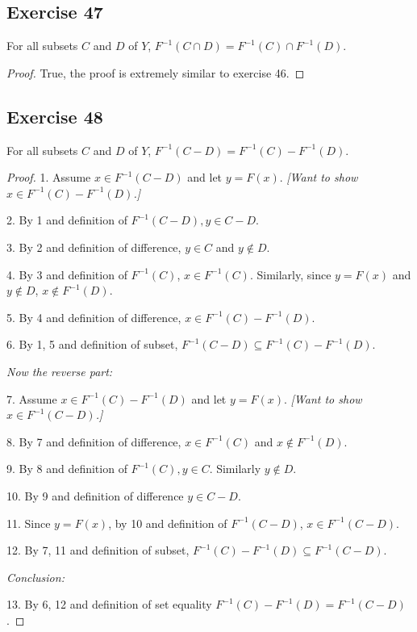 \documentclass[14pt]{extarticle}
\begin{document}
\subsection{Exercise 47}
For all subsets $C$ and $D$ of $Y$, \(F^{-1}(C \cap D) = F^{-1}(C) \cap F^{-1}(D)\).

\begin{proof}
True, the proof is extremely similar to exercise 46.
\end{proof}

\subsection{Exercise 48}
For all subsets $C$ and $D$ of $Y$, \(F^{-1}(C-D) = F^{-1}(C) - F^{-1}(D)\).

\begin{proof}
1. Assume \(x \in F^{-1}(C-D)\) and let $y = F(x)$. {\it [Want to show \(x \in F^{-1}(C) - F^{-1}(D)\).]}

2. By 1 and definition of \(F^{-1}(C-D), y \in C-D\).

3. By 2 and definition of difference, \(y \in C\) and \(y \notin D\).

4. By 3 and definition of \(F^{-1}(C)\), \(x \in F^{-1}(C)\). Similarly, since $y = F(x)$ and $y \notin D$, 
\(x \notin F^{-1}(D)\).

5. By 4 and definition of difference, \(x \in F^{-1}(C) - F^{-1}(D)\).

6. By 1, 5 and definition of subset, \(F^{-1}(C-D) \subseteq F^{-1}(C) - F^{-1}(D)\).

{\it Now the reverse part:}

7. Assume \(x \in F^{-1}(C) - F^{-1}(D)\) and let $y = F(x)$. {\it [Want to show \(x \in F^{-1}(C-D)\).]}

8. By 7 and definition of difference, \(x \in F^{-1}(C)\) and \(x \notin F^{-1}(D)\).

9. By 8 and definition of \(F^{-1}(C), y \in C\). Similarly \(y \notin D\).

10. By 9 and definition of difference \(y \in C-D\).

11. Since $y = F(x)$, by 10 and definition of \(F^{-1}(C-D)\), \(x \in F^{-1}(C-D)\).

12. By 7, 11 and definition of subset, \(F^{-1}(C) - F^{-1}(D) \subseteq F^{-1}(C-D)\).

{\it Conclusion:}

13. By 6, 12 and definition of set equality \(F^{-1}(C) - F^{-1}(D) = F^{-1}(C-D)\).
\end{proof}
\end{document}
